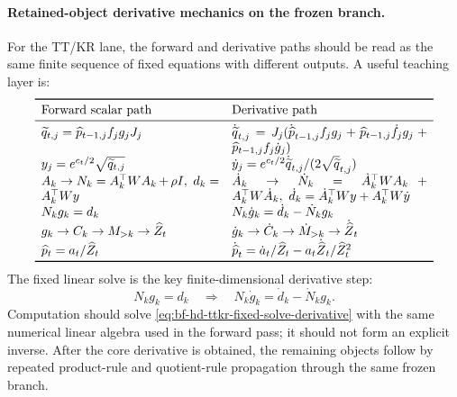 \paragraph{Retained-object derivative mechanics on the frozen branch.}
For the TT/KR lane, the forward and derivative paths should be read as the same
finite sequence of fixed equations with different outputs.  A useful teaching
layer is:
\begin{equation}
\begin{array}{p{0.41\linewidth}p{0.45\linewidth}}
\toprule
Forward scalar path & Derivative path\\
\midrule
\(\widetilde q_{t,j}=\widehat p_{t-1,j} f_j g_j J_j\) &
\(\dot{\widetilde q}_{t,j}=J_j(\dot{\widehat p}_{t-1,j}f_jg_j+\widehat p_{t-1,j}\dot f_jg_j+\widehat p_{t-1,j}f_j\dot g_j)\)\\
\(y_j=e^{c_t/2}\sqrt{\widetilde q_{t,j}}\) &
\(\dot y_j=e^{c_t/2}\dot{\widetilde q}_{t,j}/(2\sqrt{\widetilde q}_{t,j})\)\\
\(A_k\to N_k=A_k^\top W A_k+\rho I,\ d_k=A_k^\top Wy\) &
\(\dot A_k\to \dot N_k=\dot A_k^\top WA_k+A_k^\top W\dot A_k,\ \dot d_k=\dot A_k^\top Wy+A_k^\top W\dot y\)\\
\(N_k g_k=d_k\) &
\(N_k\dot g_k=\dot d_k-\dot N_k g_k\)\\
\(g_k\to C_k\to M_{>k}\to \widehat Z_t\) &
\(\dot g_k\to \dot C_k\to \dot M_{>k}\to \dot{\widehat Z}_t\)\\
\(\widehat p_t=a_t/\widehat Z_t\) &
\(\dot{\widehat p}_t=\dot a_t/\widehat Z_t-a_t\dot{\widehat Z}_t/\widehat Z_t^2\)\\
\bottomrule
\end{array}
  \label{eq:bf-hd-ttkr-derivative-teaching-table}
\end{equation}
The fixed linear solve is the key finite-dimensional derivative step:
\begin{equation}
  N_k g_k=d_k
  \quad\Longrightarrow\quad
  N_k\dot g_k=\dot d_k-\dot N_k g_k.
  \label{eq:bf-hd-ttkr-fixed-solve-derivative}
\end{equation}
Computation should solve \eqref{eq:bf-hd-ttkr-fixed-solve-derivative} with the
same numerical linear algebra used in the forward pass; it should not form an
explicit inverse.  After the core derivative is obtained, the remaining objects
follow by repeated product-rule and quotient-rule propagation through the same
frozen branch.

